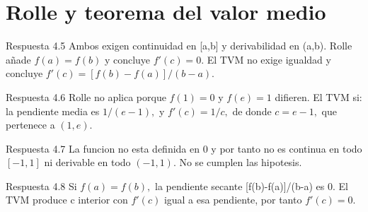 \documentclass[10pt,a4paper,oneside,openany]{book}
\begin{document}
\section{Rolle y teorema del valor medio}
\begin{PSevenAnswerFixed}{Respuesta 4.5}
Ambos exigen continuidad en [a,b] y derivabilidad en (a,b). Rolle añade \(f(a)=f(b)\) y concluye \(f'(c)=0\). El TVM no exige igualdad y concluye \(f'(c)=[f(b)-f(a)]/(b-a)\).
\end{PSevenAnswerFixed}
\begin{PSevenAnswerFixed}{Respuesta 4.6}
Rolle no aplica porque \(f(1)=0\) y \(f(e)=1\) difieren. El TVM si: la pendiente media es \(1/(e-1),\) y \(f'(c)=1/c,\) de donde \(c=e-1,\) que pertenece a \((1,e)\).
\end{PSevenAnswerFixed}
\begin{PSevenAnswerFixed}{Respuesta 4.7}
La funcion no esta definida en \(0\) y por tanto no es continua en todo \([-1,1]\) ni derivable en todo \((-1,1)\). No se cumplen las hipotesis.
\end{PSevenAnswerFixed}
\begin{PSevenAnswerFixed}{Respuesta 4.8}
Si \(f(a)=f(b),\) la pendiente secante [f(b)-f(a)]/(b-a) es \(0\). El TVM produce c interior con \(f'(c)\) igual a esa pendiente, por tanto \(f'(c)=0\).
\end{PSevenAnswerFixed}
\end{document}
